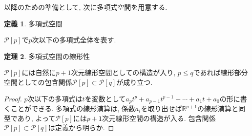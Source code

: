 \documentclass{jsarticle}
\newcommand\setR{\mathbb{R}}
\theoremstyle{definition}%
\newtheorem{thm}{定理}
\newtheorem{defn}[thm]{定義}
\begin{document}
以降のための準備として, 次に多項式空間を用意する.
\begin{screen}
	\begin{defn}
		多項式空間

		$\mathcal{P}[p]$で$p$次以下の多項式全体を表す.
	\end{defn}
\end{screen}
\begin{screen}
	\begin{thm}
		\label{Thm103}
		多項式空間の線形性

		$\mathcal{P}[p]$には自然に$p+1$次元線形空間としての構造が入り, $p\le q$であれば線形部分空間としての包含関係$\mathcal{P}[p]\subset\mathcal{P}[q]$が成り立つ.
	\end{thm}
\end{screen}
\begin{proof}
    $p$次以下の多項式は$t$を変数として$a_p t^p+a_{p-1} t^{p-1}+\cdots+a_1 t+a_0$の形に書くことができる.
    多項式の線形演算は, 係数$a_i$を取り出せば$\setR^{p+1}$の線形演算と同型であり, よって$\mathcal{P}[p]$には$p+1$次元線形空間の構造が入る.
    包含関係$\mathcal{P}[p]\subset\mathcal{P}[q]$は定義から明らか.
\end{proof}
\end{document}
